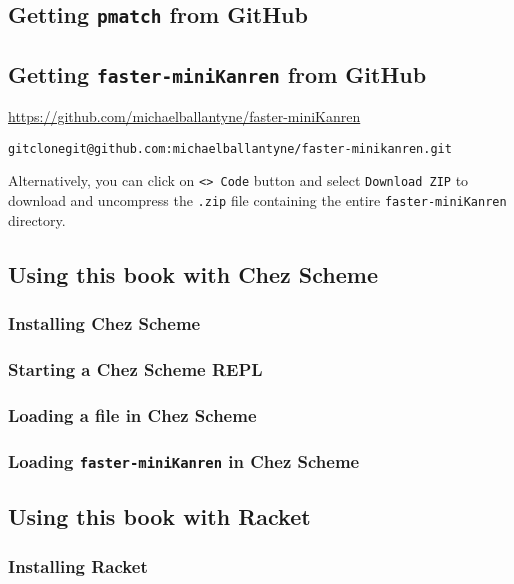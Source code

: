 \documentclass{book}
\begin{document}
\subsection{Getting \texttt{pmatch} from GitHub}

\subsection{Getting \texttt{faster-miniKanren} from GitHub}

\url{https://github.com/michaelballantyne/faster-miniKanren}

\begin{alltt}
git clone git@github.com:michaelballantyne/faster-minikanren.git
\end{alltt}

Alternatively, you can click on \verb|<> Code| button and select \verb|Download ZIP| to download and uncompress the \texttt{.zip} file containing the entire \texttt{faster-miniKanren} directory.


\subsection{Using this book with Chez Scheme}

\subsubsection{Installing Chez Scheme}

\subsubsection{Starting a Chez Scheme REPL}

\subsubsection{Loading a file in Chez Scheme}

\subsubsection{Loading \texttt{faster-miniKanren} in Chez Scheme}


\subsection{Using this book with Racket}

\subsubsection{Installing Racket}
\end{document}
